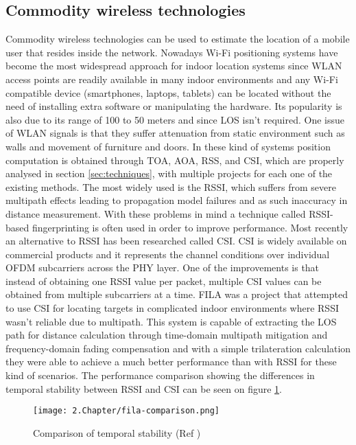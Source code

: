   
\subsection{Commodity wireless technologies}  
\label{subsec:wifi}  
  
  
Commodity wireless technologies can be used to estimate the location of a mobile user that resides inside the network. Nowadays Wi-Fi positioning systems have become the most widespread approach for indoor location systems since \ac{WLAN} access points are readily available in many indoor environments and any Wi-Fi compatible device (smartphones, laptops, tablets) can be located without the need of installing extra software or manipulating the hardware. Its popularity is also due to its range of 100 to 50 meters and since \ac{LOS} isn't required. One issue of \ac{WLAN} signals is that they suffer attenuation from static environment such as walls and movement of furniture and doors. In these kind of systems position computation is obtained through TOA, AOA, RSS, and CSI, which are properly analysed in section \ref{sec:techniques}, with multiple projects for each one of the existing methods. The most widely used is the \ac{RSSI}, which suffers from severe multipath effects leading to propagation model failures and as such inaccuracy in distance measurement. With these problems in mind a technique called RSSI-based fingerprinting is often used in order to improve performance.  
Most recently an alternative to RSSI has been researched called \ac{CSI}. \ac{CSI} is widely available on commercial products and it represents the channel conditions over individual OFDM subcarriers across the \ac{PHY} layer. One of the improvements is that instead of obtaining one \ac{RSSI} value per packet, multiple \ac{CSI} values can be obtained from multiple subcarriers at a time. FILA \cite{fila} was a project that attempted to use \ac{CSI} for locating targets in complicated indoor environments where RSSI wasn't reliable due to multipath. This system is capable of extracting the \ac{LOS} path for distance calculation through time-domain multipath mitigation and frequency-domain fading compensation and with a simple trilateration calculation they were able to achieve a much better performance than with \ac{RSSI} for these kind of scenarios. The performance comparison showing the differences in temporal stability between \ac{RSSI} and \ac{CSI} can be seen on figure \ref{fig:fila}.  
  
  
\begin{figure}[H]  
\centering  
\texttt{[image: 2.Chapter/fila-comparison.png]}  
\caption[Comparison of temporal stability (Ref \cite{fila}) ]{Comparison of temporal stability (Ref \cite{fila})}  
\label{fig:fila}  
\end{figure}  
  
